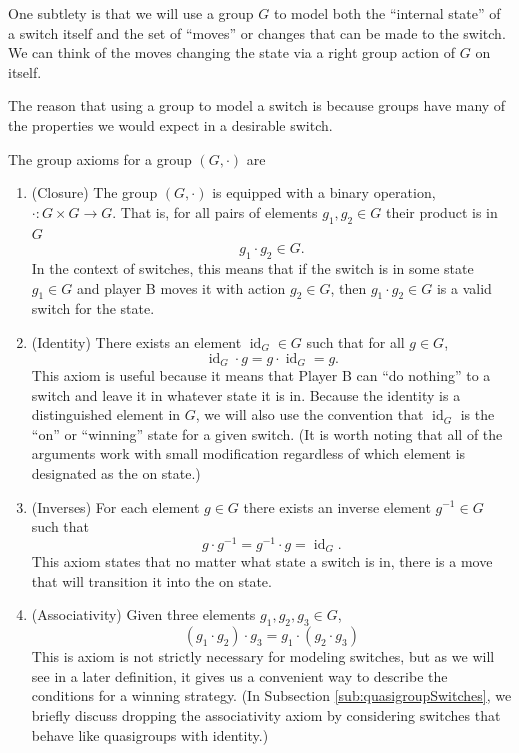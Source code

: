 One subtlety is that we will use a group $G$ to model both the ``internal state''
of a switch itself and the set of ``moves'' or changes that can be made to the
switch. We can think of the moves changing the state via a right group action of
$G$ on itself.

The reason that using a group to model a switch is because groups have many
of the properties we would expect in a desirable switch.
\begin{note}
  The group axioms for a group $(G, \cdot)$ are
\end{note}
 \begin{enumerate}
  \item (Closure) The group $(G, \cdot)$ is equipped with a binary operation,
  $\cdot \colon G \times G \rightarrow G$. That is, for all pairs of elements
   $g_1, g_2 \in G$ their product is in $G$ \[
     g_1 \cdot g_2 \in G.
  \]
  In the context of switches, this
  means that if the switch is in some state $g_1 \in G$ and player B moves
  it with action $g_2 \in G$, then $g_1 \cdot g_2 \in G$ is a valid switch for
  the state.
  \item (Identity) There exists an element $\operatorname{id}_G \in G$ such that
  for all $g \in G$, \[
    \operatorname{id}_G \cdot g = g \cdot \operatorname{id}_G = g.
  \]
  This axiom is useful because it means that Player B can ``do nothing''
  to a switch and leave it in whatever state it is in.
  Because the identity is a distinguished element in $G$,
  we will also use the convention that
  $\operatorname{id}_G$ is the ``on'' or ``winning'' state for a given switch.
  (It is worth noting that all of the arguments work with small modification
  regardless of which element is designated as the on state.)
  \item (Inverses) For each element $g \in G$ there exists an inverse element
  $g^{-1} \in G$ such that \[
    g \cdot g^{-1} = g^{-1} \cdot g = \operatorname{id}_G.
  \]
  This axiom states that no matter what state a switch is in,
  there is a move that will transition it into the on state.
  \item (Associativity) Given three elements $g_1, g_2, g_3 \in G$,
  \[
    (g_1 \cdot g_2) \cdot g_3 = g_1 \cdot (g_2 \cdot g_3)
  \]
  This is axiom is not strictly necessary for modeling switches,
  but as we will see in a later definition, it gives us a convenient way to
  describe the conditions for a winning strategy.
  (In Subsection \ref{sub:quasigroupSwitches}, we briefly discuss dropping
  the associativity axiom by considering switches that behave like
  quasigroups with identity.)
\end{enumerate}


